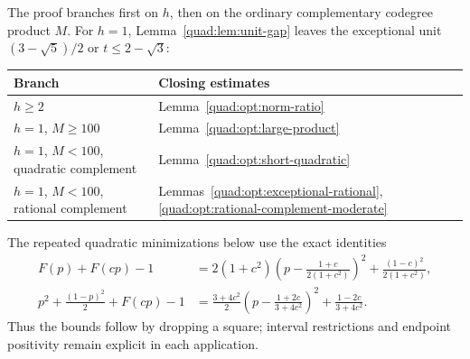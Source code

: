 The proof branches first on $h$, then on the ordinary complementary
codegree product $M$. For $h=1$, Lemma~\ref{quad:lem:unit-gap} leaves
the exceptional unit $(3-\sqrt5)/2$ or $t\le2-\sqrt3$:
\begin{center}\small
\begin{tabular}{ll}
\toprule
Branch&Closing estimates\\\midrule
$h\ge2$&Lemma~\ref{quad:opt:norm-ratio}\\
$h=1$, $M\ge100$&Lemma~\ref{quad:opt:large-product}\\
$h=1$, $M<100$, quadratic complement&Lemma~\ref{quad:opt:short-quadratic}\\
$h=1$, $M<100$, rational complement&Lemmas~\ref{quad:opt:exceptional-rational},
\ref{quad:opt:rational-complement-moderate}\\
\bottomrule
\end{tabular}
\end{center}
The repeated quadratic minimizations below use the exact identities
\begin{align}
 F(p)+F(cp)-1
 &=2(1+c^2)\left(p-\frac{1+c}{2(1+c^2)}\right)^2
       +\frac{(1-c)^2}{2(1+c^2)},\label{quad:eq:minimum-F}\\
 p^2+\frac{(1-p)^2}{2}+F(cp)-1
 &=\frac{3+4c^2}{2}\left(p-\frac{1+2c}{3+4c^2}\right)^2
       +\frac{1-2c}{3+4c^2}.\label{quad:eq:minimum-mixed}
\end{align}
Thus the bounds follow by dropping a square; interval restrictions
and endpoint positivity remain explicit in each application.

